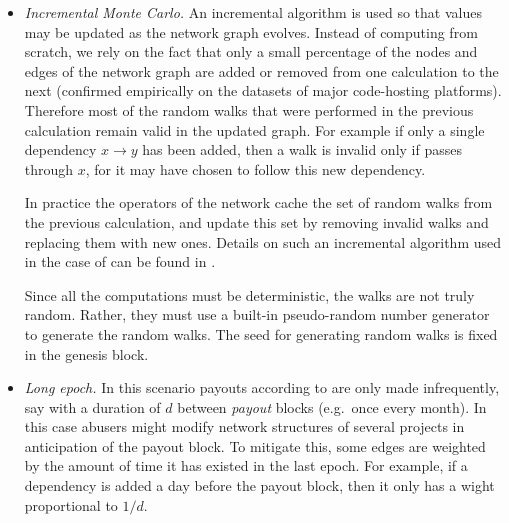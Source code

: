 \begin{itemize}
\item \emph{Incremental Monte Carlo.} An incremental algorithm is used
  so that \osrank{} values may be updated as the network graph
  evolves. Instead of computing \osrank{} from scratch, we rely on the
  fact that only a small percentage of the nodes and edges of the
  network graph are added or removed from one calculation to the next
  (confirmed empirically on the datasets of major code-hosting
  platforms). Therefore most of the random walks that were performed
  in the previous calculation remain valid in the updated graph. For
  example if only a single dependency $x \to y$ has been added, then a
  walk is invalid only if passes through $x$, for it may have chosen
  to follow this new dependency.

  In practice the operators of the network cache the set of random
  walks from the previous calculation, and update this set by removing
  invalid walks and replacing them with new ones. Details on such an
  incremental algorithm used in the case of \pagerank{} can be found
  in \cite{incr pagerank}.

  Since all the computations must be deterministic, the walks are not
  truly random. Rather, they must use a built-in pseudo-random number
  generator to generate the random walks. The seed for generating
  random walks is fixed in the genesis block.


\item \emph{Long epoch.} In this scenario payouts according to
  \osrank{} are only made infrequently, say with a duration of $d$
  between \emph{payout} blocks (e.g.\ once every month). In this case
  abusers might modify network structures of several projects in
  anticipation of the payout block. To mitigate this, some edges are
  weighted by the amount of time it has existed in the last epoch. For
  example, if a dependency is added a day before the payout block,
  then it only has a wight proportional to $1/d$.
\end{itemize}
